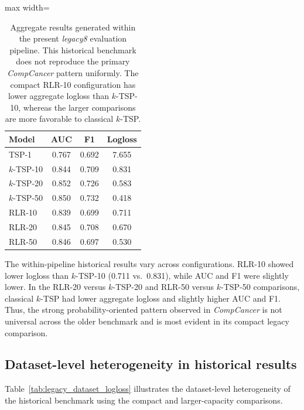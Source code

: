 \documentclass[11pt, a4paper]{article}
\newcommand{\stdtablefont}{\small}
\newcommand{\stdtablelayout}{%
  \stdtablefont
  \setlength{\tabcolsep}{4pt}
  \renewcommand{\arraystretch}{1.2}
}
\begin{document}
\begin{table}[!htbp]
\centering
\caption{Aggregate results generated within the present \emph{legacy8} evaluation pipeline. This historical benchmark does not reproduce the primary \emph{CompCancer} pattern uniformly. The compact RLR-10 configuration has lower aggregate logloss than $k$-TSP-10, whereas the larger comparisons are more favorable to classical $k$-TSP.}
\label{tab:legacy_world}
{\stdtablelayout
\begin{adjustbox}{max width=\linewidth}
\begin{tabular}{lccc}
\toprule
\textbf{Model} & \textbf{AUC} & \textbf{F1} & \textbf{Logloss} \\
\midrule
TSP-1       & 0.767 & 0.692 & 7.655 \\
$k$-TSP-10 & 0.844 & 0.709 & 0.831 \\
$k$-TSP-20 & 0.852 & 0.726 & 0.583 \\
$k$-TSP-50 & 0.850 & 0.732 & 0.418 \\
RLR-10      & 0.839 & 0.699 & 0.711 \\
RLR-20      & 0.845 & 0.708 & 0.670 \\
RLR-50      & 0.846 & 0.697 & 0.530 \\
\bottomrule
\end{tabular}
\end{adjustbox}
}
\end{table}

The within-pipeline historical results vary across configurations. RLR-10 showed lower logloss than $k$-TSP-10 (0.711 vs.\ 0.831), while AUC and F1 were slightly lower. In the RLR-20 versus $k$-TSP-20 and RLR-50 versus $k$-TSP-50 comparisons, classical $k$-TSP had lower aggregate logloss and slightly higher AUC and F1. Thus, the strong probability-oriented pattern observed in \emph{CompCancer} is not universal across the older benchmark and is most evident in its compact legacy comparison.


\subsection{Dataset-level heterogeneity in historical results}

Table~\ref{tab:legacy_dataset_logloss} illustrates the dataset-level heterogeneity of the historical benchmark using the compact and larger-capacity comparisons.
\end{document}
